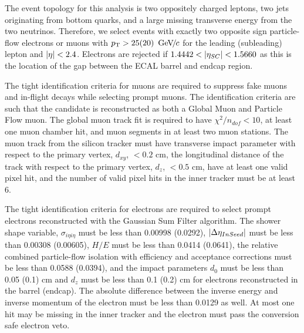 The event topology for this analysis is two oppositely charged leptons, two jets originating from bottom quarks, and a large missing transverse energy from the two neutrinos. Therefore, we select events with exactly two opposite sign particle-flow electrons or muons with $p_{\mathrm{T}}>25(20)~{\,\text{Ge\hspace{-.08em}V\hspace{-0.16em}/\hspace{-0.08em}}c}$ for the leading (subleading) lepton and $\left\vert\eta\right\vert<2.4$. Electrons are rejected if $1.4442<\left\vert\eta_{SC}\right\vert<1.5660$ as this is the location of the gap between the ECAL barrel and endcap region. 

The tight identification criteria for muons are required to suppress fake muons and in-flight decays while selecting prompt muons. The identification criteria are such that the candidate is reconstructed as both a Global Muon and Particle Flow muon. The global muon track fit is required to have $\chi^2/n_{dof} <10$, at least one muon chamber hit, and muon segments in at least two muon stations. The muon track from the silicon tracker must have transverse impact parameter with respect to the primary vertex, $d_{xy}$, $<0.2$ cm, the longitudinal distance of the track with respect to the primary vertex, $d_z$, $<0.5$ cm, have at least one valid pixel hit, and the number of valid pixel hits in the inner tracker must be at least 6. 

The tight identification criteria for electrons are required to select prompt electrons reconstructed with the Gaussian Sum Filter algorithm. The shower shape variable, $\sigma_{i\eta i\eta}$ must be less than 0.00998 (0.0292), $\left\vert\Delta\eta_{InSeed}\right\vert$ must be less than 0.00308 (0.00605), $H/E$ must be less than 0.0414 (0.0641), the relative combined particle-flow isolation with efficiency and acceptance corrections must be less than 0.0588 (0.0394), and the impact parameters $d_0$ must be less than 0.05 (0.1) cm and $d_z$ must be less than 0.1 (0.2) cm for electrons reconstructed in the barrel (endcap). The absolute difference between the inverse energy and inverse momentum of the electron must be less than 0.0129 as well. At most one hit may be missing in the inner tracker and the electron must pass the conversion safe electron veto.

